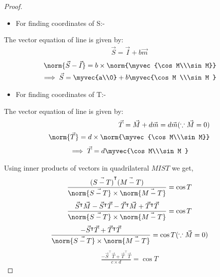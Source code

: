 \documentclass[journal,12pt,twocolumn]{IEEEtran}
\begin{document}
\begin{enumerate}
\begin{lemma}
\end{lemma}
\begin{proof}
\begin{itemize}
\item For finding coordinates of S:-
\end{itemize}
The vector equation of line is given by:
\begin{align}
\vec{S}=\vec{I} + b \vec{m} 
\end{align}
\begin{align}
\norm{\vec{S}-\vec{I}}= b\times \norm{\myvec{\cos M\\\sin M}} 
\\
\implies \vec{S}=\myvec{a\\0} + b\myvec{\cos M \\\sin M } \label{eq13}
\end{align}
\begin{itemize}
\item For finding coordinates of T:-
\end{itemize}
The vector equation of line is given by:
\begin{align}
\vec{T}=\vec{M} + d\vec{m} =d\vec{m} (\because \vec{M}=0) 
\\
\norm{\vec{T}}=d\times\norm{\myvec{\cos M\\\sin M}} 
\end{align}
\begin{align}
\implies \vec{T}=d \myvec{\cos M\\\sin M } \label{eq15}
\end{align}
\item Using inner products of vectors in quadrilateral $MIST$ we get,
\begin{align}
\frac{\vec{(S-T)}^\intercal\vec{(M-T)}}{\norm{\vec{S-T}}\times\norm{\vec{M-T}}}=\cos T 
\end{align}
\begin{align}
\frac{\vec{S}^\intercal\vec{M}-\vec{S}^\intercal \vec{T}-\vec{T}^\intercal\vec{M}+\vec{T}^\intercal \vec{T}}{\norm{\vec{S-T}}\times\norm{\vec{M-T}}}=\cos T
\end{align}
\begin{align}
\frac{-\vec{S}^\intercal \vec{T}+\vec{T}^\intercal \vec{T}}{\norm{\vec{S-T}}\times\norm{\vec{M-T}}} = \cos T ( \because \vec{M}=0) 
\end{align}
\begin{align}
\frac{-\vec{S}^\intercal \vec{T}+\vec{T}^\intercal \vec{T}}{c\times d} =\cos T \label{eqb}
\end{align}

\end{proof}
\end{enumerate}
\end{document}
